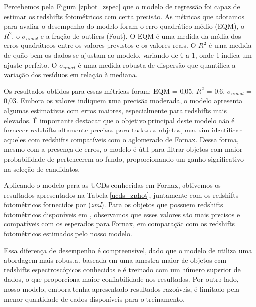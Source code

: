 Percebemos pela Figura \ref{zphot_zspec} que o modelo de regressão foi capaz de estimar os redshifts fotométricos com certa precisão. As métricas que adotamos para avaliar o desempenho do modelo foram o erro quadrático médio (EQM), o $R^2$, o $\sigma_{nmad}$ e a fração de outliers (Fout). O EQM é uma medida da média dos erros quadráticos entre os valores previstos e os valores reais. O $R^2$ é uma medida de quão bem os dados se ajustam ao modelo, variando de 0 a 1, onde 1 indica um ajuste perfeito. O $\sigma_{nmad}$ é uma medida robusta de dispersão que quantifica a variação dos resíduos em relação à mediana. 



Os resultados obtidos para essas métricas foram: EQM = 0,05, $R^2$ = 0,6, $\sigma_{nmad}$ = 0,03. Embora os valores indiquem uma precisão moderada, o modelo apresenta algumas estimativas com erros maiores, especialmente para redshifts mais elevados. É importante destacar que o objetivo principal deste modelo não é fornecer redshifts altamente precisos para todos os objetos, mas sim identificar aqueles com redshifts compatíveis com o aglomerado de Fornax. Dessa forma, mesmo com a presença de erros, o modelo é útil para filtrar objetos com maior probabilidade de pertencerem ao fundo, proporcionando um ganho significativo na seleção de candidatos.

Aplicando o modelo para as UCDs conhecidas em Fornax, obtivemos os resultados apresentados na Tabela \ref{ucds_zphot}, juntamente com os redshifts fotométricos fornecidos por \cite{erik_photoz_2024} (\textit{zml}). Para os objetos que possuem redshifts fotométricos disponíveis em \citep{erik_photoz_2024}, observamos que esses valores são mais precisos e compatíveis com os esperados para Fornax, em comparação com os redshifts fotométricos estimados pelo nosso modelo.

Essa diferença de desempenho é compreensível, dado que o modelo de \cite{erik_photoz_2024} utiliza uma abordagem mais robusta, baseada em uma amostra maior de objetos com redshifts espectroscópicos conhecidos e é treinado com um número superior de dados, o que proporciona maior confiabilidade nos resultados. Por outro lado, nosso modelo, embora tenha apresentado resultados razoáveis, é limitado pela menor quantidade de dados disponíveis para o treinamento.

